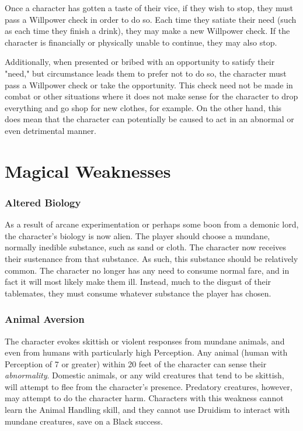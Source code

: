 \documentclass[oneside]{book}
\begin{document}
\begin{multicols}{2}
Once a character has gotten a taste of their vice, if they wish to stop, they must pass a Willpower check in order to do so. Each time they satiate their need (such as each time they finish a drink), they may make a new Willpower check. If the character is financially or physically unable to continue, they may also stop. 

Additionally, when presented or bribed with an opportunity to satisfy their "need," but circumstance leads them to prefer not to do so, the character must pass a Willpower check or take the opportunity. This check need not be made in combat or other situations where it does not make sense for the character to drop everything and go shop for new clothes, for example. On the other hand, this does mean that the character can potentially be caused to act in an abnormal or even detrimental manner. 

\section{Magical Weaknesses}
\subsubsection{Altered Biology}
As a result of arcane experimentation or perhaps some boon from a demonic lord, the character's biology is now alien. The player should choose a mundane, normally inedible substance, such as sand or cloth. The character now receives their sustenance from that substance. As such, this substance should be relatively common. The character no longer has any need to consume normal fare, and in fact it will most likely make them ill. Instead, much to the disgust of their tablemates, they must consume whatever substance the player has chosen. 

\subsubsection{Animal Aversion}
The character evokes skittish or violent responses from mundane animals, and even from humans with particularly high Perception. Any animal (human with Perception of 7 or greater) within 20 feet of the character can sense their \emph{abnormality}. Domestic animals, or any wild creatures that tend to be skittish, will attempt to flee from the character's presence. Predatory creatures, however, may attempt to do the character harm. Characters with this weakness cannot learn the Animal Handling skill, and they cannot use Druidism to interact with mundane creatures, save on a Black success. 


\end{multicols}
\end{document}
